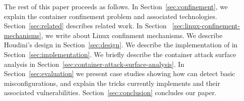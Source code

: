 The rest of this paper proceeds as follows. In Section~\ref{sec:confinement}, we explain the container confinement problem and associated technologies. Section~\ref{sec:related} describes related work. In Section ~\ref{sec:linux-confinement-mechanisms}, we write about Linux confinment mechanisms. We describe Houdini's design in Section~\ref{sec:design}. We describe the implementation of \houdini in Section~\ref{sec:implementation}. We briefly describe the container attack surface analysis in Section~\ref{sec:container-attack-surface-analysis}. In Section~\ref{sec:evaluation} we present case studies showing how \houdini can detect basic misconfigurations, and explain the tricks \houdini currently implements and their associated vulnerabilities. Section~\ref{sec:conclusion} concludes our paper.






